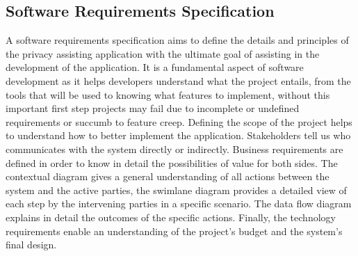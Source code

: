 

\subsection{Software Requirements Specification}
\label{subsection:software_requirements}

A software requirements specification aims to define the details and principles
of the privacy assisting
\hyperlink{\acronym}{\acronym} application with the ultimate goal of assisting in the development
of the application. It is a fundamental aspect of software development as it
helps developers understand what the project entails, from the tools that will be
used to knowing what features to implement, without this important first step projects
may fail due to incomplete or undefined requirements or succumb to feature creep.
Defining the scope of the project helps to understand
how to better implement the application.
Stakeholders tell us who communicates
with the system directly or indirectly. Business requirements are
defined in order to know in detail the possibilities of value for both sides.
The contextual diagram gives a general understanding of all actions between the
system and the active parties, the swimlane diagram provides a detailed
view of each step by the intervening parties in a specific scenario. The data
flow diagram explains in detail the outcomes of the specific actions. Finally,
the technology requirements enable an understanding of the project's budget and
the system's final design.

